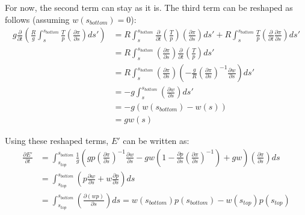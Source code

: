 For now, the second term can stay as it is.
The third term can be reshaped as follows (assuming $w(s_{bottom})=0$):
\begin{align*}
g\frac{\partial}{\partial t}\left(\frac{R}{g}\int _s ^{s_{bottom}} \frac{T}{p}\left(\frac{\partial \pi}{\partial s}\right)ds'\right) &= R\int _s ^{s_{bottom}} \frac{\partial}{\partial t}\left(\frac{T}{p}\right)\left(\frac{\partial \pi}{\partial s}\right)ds' + R\int _s ^{s_{bottom}} \frac{T}{p}\left(\frac{\partial}{\partial t}\frac{\partial \pi}{\partial s}\right)ds'\\
&= R\int _s ^{s_{bottom}} \left(\frac{\partial \pi}{\partial s}\right)\frac{\partial}{\partial t}\left(\frac{T}{p}\right)ds'\\
&= R\int _s ^{s_{bottom}} \left(\frac{\partial \pi}{\partial s}\right)\left(-\frac{g}{R}\left(\frac{\partial\pi}{\partial s}\right)^{-1}\frac{\partial w}{\partial s}\right)ds'\\
&= -g\int _s ^{s_{bottom}} \left(\frac{\partial w}{\partial s}\right)ds'\\
&= -g\left( w(s_{bottom}) - w(s) \right)\\
&= gw(s)
\end{align*}

Using these reshaped terms, $E'$ can be written as:
\begin{align*}
\frac{\partial E'}{\partial t} &= \int_{s_{top}}^{s_{bottom}} \frac{1}{g}\left(gp\left(\frac{\partial \pi}{\partial s}\right)^{-1} \frac{\partial w}{\partial s}-gw\left(1 - \frac{\partial p}{\partial s}\left(\frac{\partial \pi}{\partial s}\right)^{-1}\right)+gw \right)\left( \frac{\partial \pi}{\partial s} \right) ds\\
&=\int_{s_{top}}^{s_{bottom}} \left(p \frac{\partial w}{\partial s}+w\frac{\partial p}{\partial s}\right) ds\\
&=\int_{s_{top}}^{s_{bottom}} \left(\frac{\partial (wp)}{\partial s}\right) ds = w(s_{bottom})p(s_{bottom})-w(s_{top})p(s_{top})
\end{align*}


